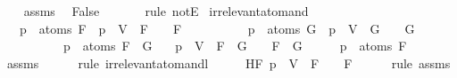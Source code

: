 \begin{isabellebody}
\ \ \isamarkupfalse%
\ assms\ \isamarkupfalse%
\ False\ \isanewline
\ \ \ \ \isamarkupfalse%
\ {\isacharparenleft}rule\ notE{\isacharparenright}\isanewline
{}\isamarkupfalse%
%
\endisatagproof
{\isafoldproof}%
%
\isadelimproof
\isanewline
%
\endisadelimproof
\isanewline
{}\isamarkupfalse%
\ irrelevant{\isacharunderscore}atom{\isacharunderscore}and{\isacharcolon}\isanewline
\ \ \ {\isachardoublequoteopen}p\ {\isasymnotin}\ atoms\ F\ {\isasymLongrightarrow}\ {\isasymA}{\isacharparenleft}p\ {\isacharcolon}{\isacharequal}\ V{\isacharparenright}\ {\isasymTurnstile}\ F\ {\isasymlongleftrightarrow}\ {\isasymA}\ {\isasymTurnstile}\ F{\isachardoublequoteclose}\isanewline
\ \ \ \ \ \ \ \ \ \ {\isachardoublequoteopen}p\ {\isasymnotin}\ atoms\ G\ {\isasymLongrightarrow}\ {\isasymA}{\isacharparenleft}p\ {\isacharcolon}{\isacharequal}\ V{\isacharparenright}\ {\isasymTurnstile}\ G\ {\isasymlongleftrightarrow}\ {\isasymA}\ {\isasymTurnstile}\ G{\isachardoublequoteclose}\isanewline
\ \ \ \ \ \ \ \ \ \ {\isachardoublequoteopen}p\ {\isasymnotin}\ atoms\ {\isacharparenleft}F\ \isactrlbold {\isasymand}\ G{\isacharparenright}{\isachardoublequoteclose}\isanewline
\ \ \ {\isachardoublequoteopen}{\isasymA}{\isacharparenleft}p\ {\isacharcolon}{\isacharequal}\ V{\isacharparenright}\ {\isasymTurnstile}\ {\isacharparenleft}F\ \isactrlbold {\isasymand}\ G{\isacharparenright}\ {\isasymlongleftrightarrow}\ {\isasymA}\ {\isasymTurnstile}\ {\isacharparenleft}F\ \isactrlbold {\isasymand}\ G{\isacharparenright}{\isachardoublequoteclose}\isanewline
%
\isadelimproof
%
\endisadelimproof
%
\isatagproof
{}\isamarkupfalse%
\ {\isacharminus}\isanewline
\ \ \isamarkupfalse%
\ {\isachardoublequoteopen}p\ {\isasymnotin}\ atoms\ F{\isachardoublequoteclose}\isanewline
\ \ \ \ \isamarkupfalse%
\ assms{\isacharparenleft}{}{\isacharparenright}\isanewline
\ \ \ \ \isamarkupfalse%
\ {\isacharparenleft}rule\ irrelevant{\isacharunderscore}atom{\isacharunderscore}and{\isacharunderscore}l{}{\isacharparenright}\isanewline
\ \ \isamarkupfalse%
\ \isamarkupfalse%
\ HF{\isacharcolon}\ {\isachardoublequoteopen}{\isasymA}{\isacharparenleft}p\ {\isacharcolon}{\isacharequal}\ V{\isacharparenright}\ {\isasymTurnstile}\ F\ {\isasymlongleftrightarrow}\ {\isasymA}\ {\isasymTurnstile}\ F{\isachardoublequoteclose}\isanewline
\ \ \ \ \isamarkupfalse%
\ {\isacharparenleft}rule\ assms{\isacharparenleft}{}{\isacharparenright}{\isacharparenright}\isanewline

\end{isabellebody}

